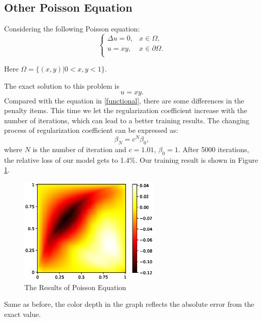 \documentclass{article}
\begin{document}
\subsection{Other Poisson Equation}
\par Considering the following Poisson equation:
\begin{equation}
	\begin{cases}
		\Delta u=0, & x\in \Omega, \\
 		u=xy, & x\in \partial \Omega. \\
 	\end{cases}
\end{equation}

Here $\Omega =\{(x,y)| 0<x,y<1\}$.
\par The exact solution to this problem is 
\begin{equation}
u=xy.
\end{equation}
Compared with the equation in \ref{functional}, there are some differences in the penalty items. This time we let the regularization coefficient increase with the number of iterations, which can lead to a better training results. The changing process of regularization coefficient can be expressed as:
\begin{equation}
\beta_{N} = c^{N}\beta_{0},
\end{equation}
where $N$ is the number of iteration and $c = 1.01$, $\beta_0=1$. After 5000 iterations, the relative loss of our model gets to 1.4\%. Our training result is shown in Figure \ref{3.2a}.
\begin{figure}[ht]
 	 \centering
 	 \includegraphics[width=0.6\textwidth]{./images/loss_yubing.eps} 
	 \caption{The Results of Poisson Equation}
	 \label{3.2a}
\end{figure}

Same as before, the color depth in the graph reflects the absolute error from the exact value.
\end{document}
